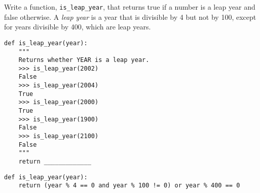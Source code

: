 \begin{blocksection}
\question Write a function, \lstinline$is_leap_year$, that returns true if a number is a leap year and false otherwise.
A \emph{leap year} is a year that is divisible by 4 but not by 100, except for years divisible by 400, which are leap years. 

\begin{lstlisting}
def is_leap_year(year):
    """
    Returns whether YEAR is a leap year. 
    >>> is_leap_year(2002)
    False
    >>> is_leap_year(2004)
    True
    >>> is_leap_year(2000)
    True
    >>> is_leap_year(1900)
    False
    >>> is_leap_year(2100)
    False
    """
    return _____________
\end{lstlisting}


\begin{solution}[2in]
\begin{lstlisting}
def is_leap_year(year):
    return (year % 4 == 0 and year % 100 != 0) or year % 400 == 0
\end{lstlisting}
\end{solution}
\end{blocksection}